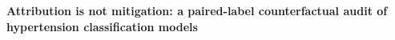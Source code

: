 \begin{flushleft}{\LARGE\bfseries Attribution is not mitigation: a paired-label counterfactual audit of hypertension classification models\par}\vspace{8pt}{\large Cong-Danh Tran\par}\end{flushleft}\vspace{4pt}